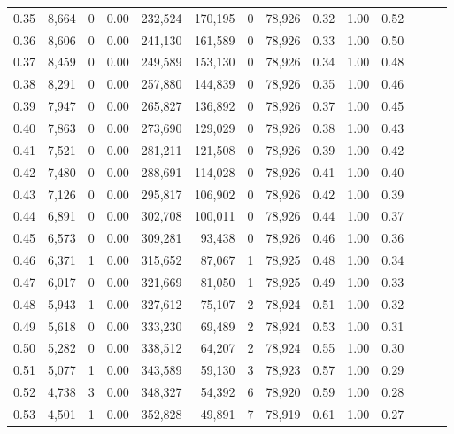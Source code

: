 \begin{tabular}{rrrrrrrrrrrrrr}
0.35 &  8,664 &      0 &  0.00 &  232,524 &  170,195 &       0 &  78,926 &  0.32 &  1.00 &      0.52 \\
0.36 &  8,606 &      0 &  0.00 &  241,130 &  161,589 &       0 &  78,926 &  0.33 &  1.00 &      0.50 \\
0.37 &  8,459 &      0 &  0.00 &  249,589 &  153,130 &       0 &  78,926 &  0.34 &  1.00 &      0.48 \\
0.38 &  8,291 &      0 &  0.00 &  257,880 &  144,839 &       0 &  78,926 &  0.35 &  1.00 &      0.46 \\
0.39 &  7,947 &      0 &  0.00 &  265,827 &  136,892 &       0 &  78,926 &  0.37 &  1.00 &      0.45 \\
0.40 &  7,863 &      0 &  0.00 &  273,690 &  129,029 &       0 &  78,926 &  0.38 &  1.00 &      0.43 \\
0.41 &  7,521 &      0 &  0.00 &  281,211 &  121,508 &       0 &  78,926 &  0.39 &  1.00 &      0.42 \\
0.42 &  7,480 &      0 &  0.00 &  288,691 &  114,028 &       0 &  78,926 &  0.41 &  1.00 &      0.40 \\
0.43 &  7,126 &      0 &  0.00 &  295,817 &  106,902 &       0 &  78,926 &  0.42 &  1.00 &      0.39 \\
0.44 &  6,891 &      0 &  0.00 &  302,708 &  100,011 &       0 &  78,926 &  0.44 &  1.00 &      0.37 \\
0.45 &  6,573 &      0 &  0.00 &  309,281 &   93,438 &       0 &  78,926 &  0.46 &  1.00 &      0.36 \\
0.46 &  6,371 &      1 &  0.00 &  315,652 &   87,067 &       1 &  78,925 &  0.48 &  1.00 &      0.34 \\
0.47 &  6,017 &      0 &  0.00 &  321,669 &   81,050 &       1 &  78,925 &  0.49 &  1.00 &      0.33 \\
0.48 &  5,943 &      1 &  0.00 &  327,612 &   75,107 &       2 &  78,924 &  0.51 &  1.00 &      0.32 \\
0.49 &  5,618 &      0 &  0.00 &  333,230 &   69,489 &       2 &  78,924 &  0.53 &  1.00 &      0.31 \\
0.50 &  5,282 &      0 &  0.00 &  338,512 &   64,207 &       2 &  78,924 &  0.55 &  1.00 &      0.30 \\
0.51 &  5,077 &      1 &  0.00 &  343,589 &   59,130 &       3 &  78,923 &  0.57 &  1.00 &      0.29 \\
0.52 &  4,738 &      3 &  0.00 &  348,327 &   54,392 &       6 &  78,920 &  0.59 &  1.00 &      0.28 \\
0.53 &  4,501 &      1 &  0.00 &  352,828 &   49,891 &       7 &  78,919 &  0.61 &  1.00 &      0.27 \\

\end{tabular}
